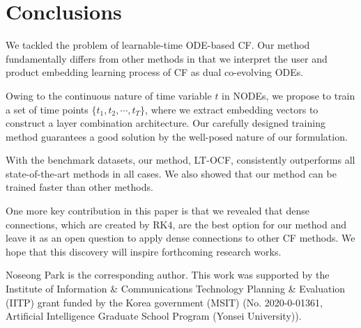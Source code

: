 \documentclass[sigconf]{acmart}
\begin{document}
\section{Conclusions}
We tackled the problem of learnable-time ODE-based CF. Our method fundamentally differs from other methods in that we interpret the user and product embedding learning process of CF as dual co-evolving ODEs.

Owing to the continuous nature of time variable $t$ in NODEs, we propose to train a set of time points $\{t_1, t_2, \cdots, t_T\}$, where we extract embedding vectors to construct a layer combination architecture. Our carefully designed training method guarantees a good solution by the well-posed nature of our formulation.

With the  benchmark datasets, our method, LT-OCF, consistently outperforms all state-of-the-art methods in all cases. We also showed that our method can be trained faster than other methods.

One more key contribution in this paper is that we revealed that dense connections, which are created by RK4, are the best option for our method and leave it as an open question to apply dense connections to other CF methods. We hope that this discovery will inspire forthcoming research works.

\begin{acks}
Noseong Park is the corresponding author. This work was supported by the Institute of Information \& Communications Technology Planning \& Evaluation (IITP) grant funded by the Korea government (MSIT) (No. 2020-0-01361, Artificial Intelligence Graduate School Program (Yonsei University)).
\end{acks}

\clearpage



\end{document}
